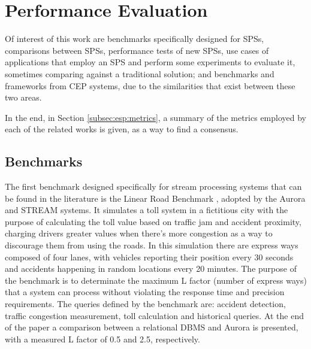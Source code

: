 \documentclass[ppgc,diss,english]{iiufrgs}
\begin{document}
\section{Performance Evaluation}
\label{sec:esp:performance_evaluation}

Of interest of this work are benchmarks specifically designed for SPSs, comparisons between SPSs, performance tests of new SPSs, use cases of applications that employ an SPS and perform some experiments to evaluate it, sometimes comparing against a traditional solution; and benchmarks and frameworks from CEP systems, due to the similarities that exist between these two areas.

In the end, in Section \ref{subsec:esp:metrics}, a summary of the metrics employed by each of the related works is given, as a way to find a consensus.

\subsection{Benchmarks}
\label{subsec:esp:benchmarks}

The first benchmark designed specifically for stream processing systems that can be found in the literature is the Linear Road Benchmark \cite{arasu2004linear}, adopted by the Aurora \cite{abadi2003aurora} and STREAM \cite{arasu2004stream} systems. It simulates a toll system in a fictitious city with the purpose of calculating the toll value based on traffic jam and accident proximity, charging drivers greater values when there's more congestion as a way to discourage them from using the roads. In this simulation there are express ways composed of four lanes, with vehicles reporting their position every 30 seconds and accidents happening in random locations every 20 minutes. The purpose of the benchmark is to determinate the maximum L factor (number of express ways) that a system can process without violating the response time and precision requirements. The queries defined by the benchmark are: accident detection, traffic congestion measurement, toll calculation and historical queries. At the end of the paper a comparison between a relational DBMS and Aurora is presented, with a measured L factor of 0.5 and 2.5, respectively.

\end{document}
